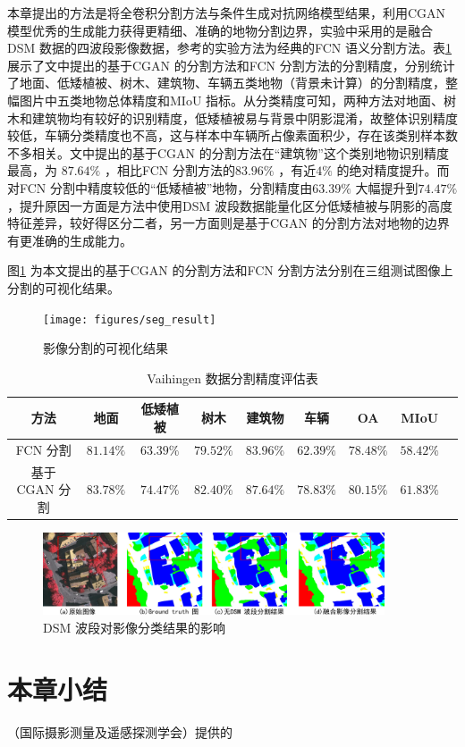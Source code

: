 本章提出的方法是将全卷积分割方法与条件生成对抗网络模型结果，利用CGAN 模型优秀的生成能力获得更精细、准确的地物分割边界，实验中采用的是融合DSM 数据的四波段影像数据，参考的实验方法为经典的FCN 语义分割方法。表\ref{tab:seg_refult} 展示了文中提出的基于CGAN 的分割方法和FCN 分割方法的分割精度，分别统计了地面、低矮植被、树木、建筑物、车辆五类地物（背景未计算）的分割精度，整幅图片中五类地物总体精度和MIoU 指标。从分类精度可知，两种方法对地面、树木和建筑物均有较好的识别精度，低矮植被易与背景中阴影混淆，故整体识别精度较低，车辆分类精度也不高，这与样本中车辆所占像素面积少，存在该类别样本数不多相关。文中提出的基于CGAN 的分割方法在“建筑物”这个类别地物识别精度最高，为 $87.64\%$ ，相比FCN 分割方法的$83.96\%$ ，有近$4\%$ 的绝对精度提升。而对FCN 分割中精度较低的“低矮植被”地物，分割精度由$63.39\%$ 大幅提升到$74.47\%$，提升原因一方面是方法中使用DSM 波段数据能量化区分低矮植被与阴影的高度特征差异，较好得区分二者，另一方面则是基于CGAN 的分割方法对地物的边界有更准确的生成能力。

图\ref{fig:seg_result} 为本文提出的基于CGAN 的分割方法和FCN 分割方法分别在三组测试图像上分割的可视化结果。

\begin{figure}[htb]
  \centering
  \texttt{[image: figures/seg\_result]}
  \caption{影像分割的可视化结果}\label{fig:seg_result}
\end{figure}


\begin{table}[htbp]
  \caption{Vaihingen 数据分割精度评估表}\label{tab:seg_refult}
  \centering
  \begin{tabular}{ccccccccc}
    \toprule
    方法              & 地面 & 低矮植被 & 树木 & 建筑物 & 车辆 & OA & MIoU \\
    \midrule
    FCN 分割      & $81.14\%$ & $63.39\%$ & $79.52\%$ & $83.96\%$ & $62.39\%$   & $78.48\%$ & $58.42\%$ \\
    基于CGAN 分割 & $83.78\%$ & $74.47\%$ & $82.40\%$ & $87.64\%$ & $78.83\%$ & $80.15\%$ & \textbf{$61.83\%$} \\
    \bottomrule
  \end{tabular}
\end{table}


\begin{figure}[htb]
  \centering
  \includegraphics[width=0.9\textwidth]{figures/dsm_affect}
  \caption{DSM 波段对影像分类结果的影响}\label{fig:dsm_affect}
\end{figure}


\section{本章小结}
\label{sec:forth}
（国际摄影测量及遥感探测学会）提供的
